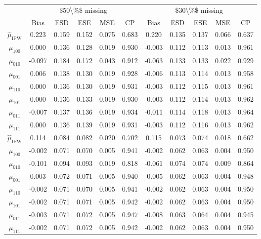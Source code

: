 \documentclass[
]{article}
\begin{document}
\begin{table}[!h]
\centering
\begin{tabular}{ccccccccccc}
\toprule
\multicolumn{1}{c}{} & \multicolumn{5}{c}{\$50\textbackslash{}\%\$ missing} & \multicolumn{5}{c}{\$30\textbackslash{}\%\$ missing} \\
\cmidrule(l{3pt}r{3pt}){2-6} \cmidrule(l{3pt}r{3pt}){7-11}
 & Bias & ESD & ESE & MSE & CP & Bias & ESD & ESE & MSE & CP\\
\midrule
$\hat{\mu}_\text{IPW}$ & 0.223 & 0.159 & 0.152 & 0.075 & 0.683 & 0.220 & 0.135 & 0.137 & 0.066 & 0.637\\
$\hat{\mu}_{100}$ & 0.000 & 0.136 & 0.128 & 0.019 & 0.930 & -0.003 & 0.112 & 0.113 & 0.013 & 0.961\\
$\hat{\mu}_{010}$ & -0.097 & 0.184 & 0.172 & 0.043 & 0.912 & -0.063 & 0.133 & 0.133 & 0.022 & 0.929\\
$\hat{\mu}_{001}$ & 0.006 & 0.138 & 0.130 & 0.019 & 0.928 & -0.006 & 0.113 & 0.114 & 0.013 & 0.958\\
$\hat{\mu}_{110}$ & 0.000 & 0.136 & 0.130 & 0.019 & 0.931 & -0.003 & 0.112 & 0.115 & 0.013 & 0.961\\
$\hat{\mu}_{101}$ & 0.000 & 0.136 & 0.133 & 0.019 & 0.930 & -0.003 & 0.112 & 0.114 & 0.013 & 0.962\\
$\hat{\mu}_{011}$ & -0.007 & 0.137 & 0.136 & 0.019 & 0.934 & -0.011 & 0.114 & 0.118 & 0.013 & 0.964\\
$\hat{\mu}_{111}$ & 0.000 & 0.136 & 0.139 & 0.019 & 0.931 & -0.003 & 0.112 & 0.116 & 0.013 & 0.962\\
$\hat{\mu}_\text{IPW}$ & 0.114 & 0.084 & 0.082 & 0.020 & 0.702 & 0.115 & 0.073 & 0.074 & 0.018 & 0.662\\
$\hat{\mu}_{100}$ & -0.002 & 0.071 & 0.070 & 0.005 & 0.941 & -0.002 & 0.062 & 0.063 & 0.004 & 0.950\\
$\hat{\mu}_{010}$ & -0.101 & 0.094 & 0.093 & 0.019 & 0.818 & -0.061 & 0.074 & 0.074 & 0.009 & 0.864\\
$\hat{\mu}_{001}$ & 0.003 & 0.072 & 0.071 & 0.005 & 0.940 & -0.005 & 0.062 & 0.063 & 0.004 & 0.948\\
$\hat{\mu}_{110}$ & -0.002 & 0.071 & 0.070 & 0.005 & 0.941 & -0.002 & 0.062 & 0.063 & 0.004 & 0.950\\
$\hat{\mu}_{101}$ & -0.002 & 0.071 & 0.071 & 0.005 & 0.942 & -0.002 & 0.062 & 0.063 & 0.004 & 0.950\\
$\hat{\mu}_{011}$ & -0.003 & 0.071 & 0.072 & 0.005 & 0.947 & -0.008 & 0.063 & 0.064 & 0.004 & 0.945\\
$\hat{\mu}_{111}$ & -0.002 & 0.071 & 0.072 & 0.005 & 0.942 & -0.002 & 0.062 & 0.063 & 0.004 & 0.950\\
\bottomrule
\end{tabular}
\end{table}
\end{document}
